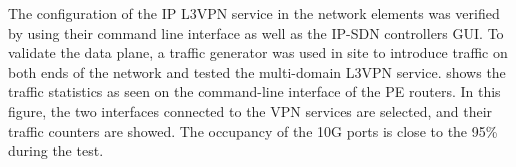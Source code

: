 \documentclass[10pt, conference]{IEEEtran}
\begin{document}


The configuration of the IP L3VPN service in the network elements was verified by using their command line interface as well as the IP-SDN controllers GUI. To validate the data plane, a traffic generator was used in site to introduce traffic on both ends of the network and tested the multi-domain L3VPN service.  shows the traffic statistics as seen on the command-line interface of the PE routers. In this figure, the two interfaces connected to the VPN services are selected, and their traffic counters are showed. The occupancy of the 10G ports is close to the 95\% during the test. 


\end{document}
